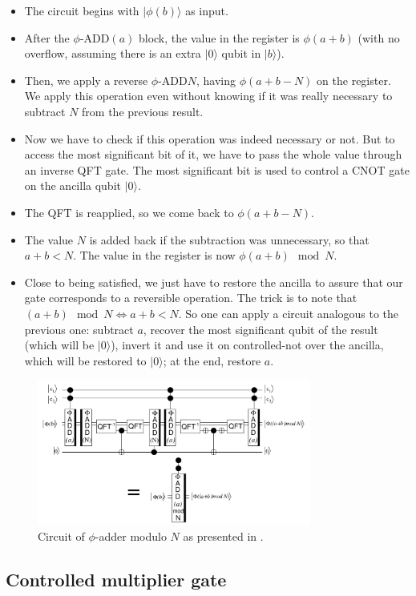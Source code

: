 \documentclass[a4paper, 10pt]{article}
\numberwithin{equation}{section}
\numberwithin{figure}{section}
\numberwithin{table}{section}
\begin{document}
\begin{itemize}
	\item The circuit begins with $|\phi(b)\rangle$ as input.
	\item After the $\phi$-ADD$(a)$ block, the value in the register is $\phi(a+b)$ (with no overflow, assuming there is an extra $|0\rangle$ qubit in $|b\rangle$).
	\item Then, we apply a reverse $\phi$-ADD$N$, having $\phi(a+b-N)$ on the register. We apply this operation even without knowing if it was really necessary to subtract $N$ from the previous result.
	\item Now we have to check if this operation was indeed necessary or not. But to access the most significant bit of it, we have to pass the whole value through an inverse QFT gate. The most significant bit is used to control a CNOT gate on the ancilla qubit $|0\rangle$.
	\item The QFT is reapplied, so we come back to $\phi(a+b-N)$.
	\item The value $N$ is added back if the subtraction was unnecessary, so that $a+b < N$. The value in the register is now $\phi(a+b)\mod N$.
	\item Close to being satisfied, we just have to restore the ancilla to assure that our gate corresponds to a reversible operation. The trick is to note that $(a+b)\mod N \Leftrightarrow a+b<N$. So one can apply a circuit analogous to the previous one: subtract $a$, recover the most significant qubit of the result (which will be $|0\rangle$), invert it and use it on controlled-not over the ancilla, which will be restored to $|0\rangle$; at the end, restore $a$.
\end{itemize}

\begin{figure}[h!]
	\centering
	\includegraphics[width=9cm]{Figures/modadder}
	\caption{Circuit of $\phi$-adder modulo $N$ as presented in \cite{beauregard}.}
	\label{fig-modadd}
\end{figure}

\subsection{Controlled multiplier gate}
\end{document}
